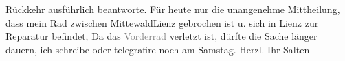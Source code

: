 \begin{ledgroupsized}[t]{13cm}
               Rückkehr ausführlich beantworte. Für heute nur die unangenehme Mittheilung, dass mein
               Rad zwischen MittewaldLienz gebrochen ist u. sich in Lienz zur Reparatur befindet, Da das
                  \textcolor{gray}{Vorderrad} verletzt ist, dürfte die Sache länger dauern, ich
               schreibe oder telegrafire noch am Samstag.\pend
           \pstart Herzl. Ihr \spacefill\mbox{Salten}\pend{}
         
         \endnumbering{}\end{ledgroupsized}\begin{anhang}\end{anhang}\newcommand{\dateiname}{L03125}\newcommand{\titel}{Felix Salten an Arthur Schnitzler, 17. 8. 1893}\newcommand{\editorInnen}{Martin Anton Müller und Laura Untner}
      